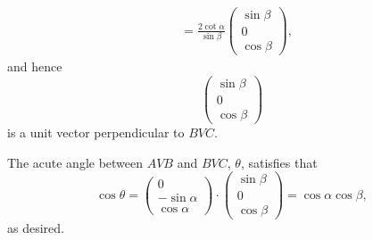 \begin{enumerate}
\begin{align*}
                                           & = \frac{2 \cot \alpha}{\sin \beta} \begin{pmatrix}
                                                                                    \sin \beta \\
                                                                                    0          \\
                                                                                    \cos \beta
                                                                                \end{pmatrix},
          \end{align*}
          and hence
          \[
              \begin{pmatrix}
                  \sin \beta \\
                  0          \\
                  \cos \beta
              \end{pmatrix}
          \]
          is a unit vector perpendicular to \(BVC\).

          The acute angle between \(AVB\) and \(BVC\), \(\theta\), satisfies that
          \[
              \cos \theta = \begin{pmatrix}
                  0             \\
                  - \sin \alpha \\
                  \cos \alpha
              \end{pmatrix} \cdot \begin{pmatrix}
                  \sin \beta \\
                  0          \\
                  \cos \beta
              \end{pmatrix} = \cos \alpha \cos \beta,
          \]
          as desired.


\end{enumerate}
